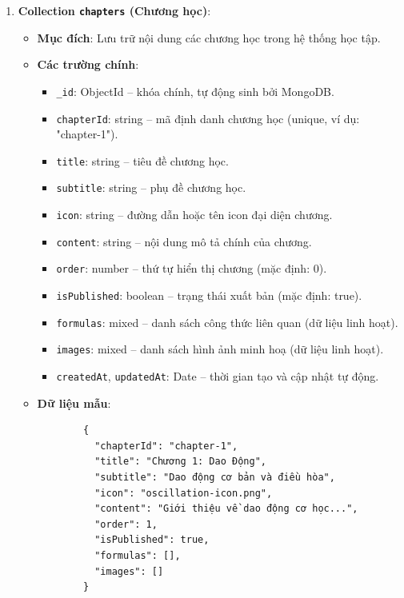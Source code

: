 \begin{enumerate}
    \item \textbf{Collection \texttt{chapters} (Chương học)}:
    \begin{itemize}
        \item \textbf{Mục đích}: Lưu trữ nội dung các chương học trong hệ thống học tập.
    
        \item \textbf{Các trường chính}:
        \begin{itemize}
            \item \texttt{\_id}: ObjectId – khóa chính, tự động sinh bởi MongoDB.
            
            \item \texttt{chapterId}: string – mã định danh chương học (unique, ví dụ: "chapter-1").
            
            \item \texttt{title}: string – tiêu đề chương học.
            
            \item \texttt{subtitle}: string – phụ đề chương học.
            
            \item \texttt{icon}: string – đường dẫn hoặc tên icon đại diện chương.
            
            \item \texttt{content}: string – nội dung mô tả chính của chương.
            
            \item \texttt{order}: number – thứ tự hiển thị chương (mặc định: 0).
            
            \item \texttt{isPublished}: boolean – trạng thái xuất bản (mặc định: true).
            
            \item \texttt{formulas}: mixed – danh sách công thức liên quan (dữ liệu linh hoạt).
            
            \item \texttt{images}: mixed – danh sách hình ảnh minh hoạ (dữ liệu linh hoạt).
            
            \item \texttt{createdAt}, \texttt{updatedAt}: Date – thời gian tạo và cập nhật tự động.
        \end{itemize}
    
        \item \textbf{Dữ liệu mẫu}:
        \begin{verbatim}
        {
          "chapterId": "chapter-1",
          "title": "Chương 1: Dao Động",
          "subtitle": "Dao động cơ bản và điều hòa",
          "icon": "oscillation-icon.png",
          "content": "Giới thiệu về dao động cơ học...",
          "order": 1,
          "isPublished": true,
          "formulas": [],
          "images": []
        }
        \end{verbatim}
    

\end{itemize}
\end{enumerate}
